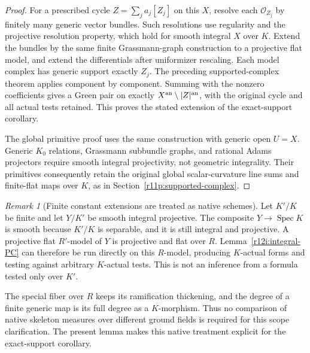 \documentclass[11pt,a4paper]{article}
\theoremstyle{definition}
\theoremstyle{remark}
\newtheorem{remark}[theorem]{Remark}
\begin{document}
\begin{proof}
For a prescribed cycle $Z=\sum_j a_j[Z_j]$ on this $X$, resolve each
$\mathcal O_{Z_j}$ by finitely many generic vector bundles.  Such
resolutions use regularity and the projective resolution property,
which hold for smooth integral $X$ over $K$.  Extend the bundles by
the same finite Grassmann-graph construction to a projective flat
model, and extend the differentials after uniformizer rescaling.
Each model complex has generic support exactly $Z_j$.  The preceding
supported-complex theorem applies component by component.  Summing
with the nonzero coefficients gives a Green pair on exactly
$X^{\rm an}\setminus|Z|^{\rm an}$, with the original cycle and all
actual tests retained.  This proves the stated extension of the
exact-support corollary.

The global primitive proof uses the same construction with generic
open $U=X$.  Generic $K_0$ relations, Grassmann subbundle graphs,
and rational Adams projectors require smooth integral projectivity,
not geometric integrality.  Their primitives consequently retain
the original global scalar-curvature line sums and finite-flat maps
over $K$, as in Section~\ref{r11p:supported-complex}.
\end{proof}

\begin{remark}[Finite constant extensions are treated as native schemes]\label{h22:native-constant-extensions}
Let $K'/K$ be finite and let $Y/K'$ be smooth integral projective.
The composite $Y\to\operatorname{Spec}K$ is smooth because
$K'/K$ is separable, and it is still integral and projective.
A projective flat $R'$-model of $Y$ is projective and flat over $R$.
Lemma~\ref{r12i:integral-PC} can therefore be run directly on this
$R$-model, producing $K$-actual forms and testing against arbitrary
$K$-actual tests.  This is not an inference from a formula tested
only over $K'$.

The special fiber over $R$ keeps its ramification thickening, and
the degree of a finite generic map is its full degree as a
$K$-morphism.  Thus no comparison of native skeleton measures over
different ground fields is required for this scope clarification.
The present lemma makes this native treatment explicit for the
exact-support corollary.
\end{remark}
\end{document}
